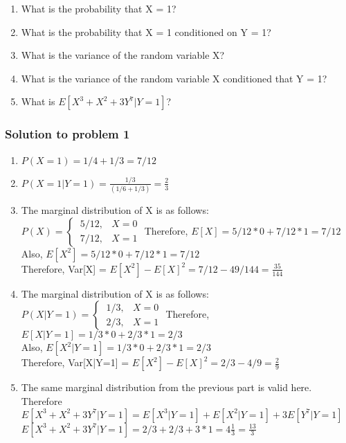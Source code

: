 \documentclass[12pt]{article}%
\begin{document}
\begin{enumerate}
    \item What is the probability that X = 1?
    \item What is the probability that X = 1 conditioned on Y = 1?
    \item What is the variance of the random variable X?
    \item What is the variance of the random variable X conditioned that Y = 1?
    \item What is $E[X^3 + X^2 + 3Y^7|Y = 1]$? 
\end{enumerate}

\subsubsection{Solution to problem 1}

\begin{enumerate}
    \item $P(X=1) =  1/4 + 1/3 = 7/12$
    \item $P(X=1|Y=1) = \frac{1/3}{(1/6 + 1/3)} = \frac{2}{3}$
    \item The marginal distribution of X is as follows:\\
            $P(X)= 
            \begin{cases}
            \ 5/12 ,&  X = 0\\
            \ 7/12,              & X = 1
            \end{cases}$
            \newline
            Therefore, $E[X] = 5/12 * 0 + 7/12 * 1 = 7/12$\\
            Also, $E[X^2] = 5/12 * 0 + 7/12 * 1 = 7/12$\\
            Therefore, Var[X] = $E[X^2] - E[X]^2 = 7/12 - 49/144 = \frac{35}{144}$
            
    \item The marginal distribution of X is as follows:\\
            $P(X|Y=1)= 
            \begin{cases}
            \ 1/3 ,&  X = 0\\
            \ 2/3 ,& X = 1
            \end{cases}$
            \newline
            Therefore, $E[X|Y=1] = 1/3 * 0 + 2/3 * 1 = 2/3$\\
            Also, $E[X^2|Y=1] = 1/3 * 0 + 2/3 * 1 = 2/3$\\
            Therefore, Var[X|Y=1] = $E[X^2] - E[X]^2 = 2/3 - 4/9 = \frac{2}{9}$
    \item The same marginal distribution from the previous part is valid here. Therefore\\
    $E[X^3 + X^2 + 3Y^7|Y = 1] = E[X^3|Y=1] + E[X^2|Y=1] + 3E[Y^7|Y=1]$\\
    $E[X^3 + X^2 + 3Y^7|Y = 1] = 2/3 + 2/3 + 3*1 = 4\frac{1}{3} = \frac{13}{3}$
\end{enumerate}
\end{document}
